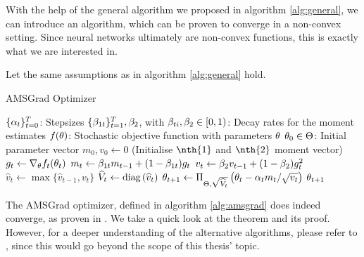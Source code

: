 With the help of the general algorithm we proposed in algorithm \ref{alg:general}, we can introduce an algorithm, which can be proven to converge in a non-convex setting. Since neural networks ultimately are non-convex functions, this is exactly what we are interested in.

\begin{algorithm}[H]
Let the same assumptions as in algorithm \ref{alg:general} hold.
\caption{AMSGrad Optimizer}\label{alg:amsgrad}
\begin{algorithmic}[1]
\Require $\{\alpha_t\}_{t=0}^T$: Stepsizes
\Require $\{\beta_{1t}\}_{t=1}^T, \beta_2$, with $\beta_{ti},\beta_2\in [0,1)$: Decay rates for the moment estimates
\Require $f(\theta)$: Stochastic objective function with parameters $\theta$
\Require $\theta_0\in\operatorname{\Theta}$: Initial parameter vector
\State $m_0,v_0 \gets 0$ (Initialise $\nth{1}$ and $\nth{2}$ moment vector)
	\State $g_t \gets \nabla_{\theta}f_t(\theta_{t})$ 
	\State $m_t \gets \beta_{1t}m_{t-1} + (1-\beta_{1t})g_t$ 
	\State $v_t \gets \beta_{2}v_{t-1} + (1-\beta_{2})g_t^2$ 
	\State $\hat{v}_{t} \gets \max\{\hat{v}_{t-1}, v_t\}$ 
	\State $\widehat{V}_{t} \gets \operatorname{\text{diag}}\left(\widehat{v}_{t}\right)$ 
	\State $\theta_{t+1} \gets \Pi_{\operatorname{\Theta},\sqrt{\widehat{V}_t}}\left(\theta_{t} - \alpha_tm_t/\sqrt{v_t}\right)$ 
\EndFor
\State \Return $\theta_{t+1}$ 
\end{algorithmic}
\end{algorithm}

The AMSGrad optimizer, defined in algorithm \ref{alg:amsgrad} does indeed converge, as proven in \cite[Theorem~4]{reddi2019convergence}. We take a quick look at the theorem and its proof. However, for a deeper understanding of the alternative algorithms, please refer to  \cite{reddi2019convergence}, since this would go beyond the scope of this thesis' topic.

